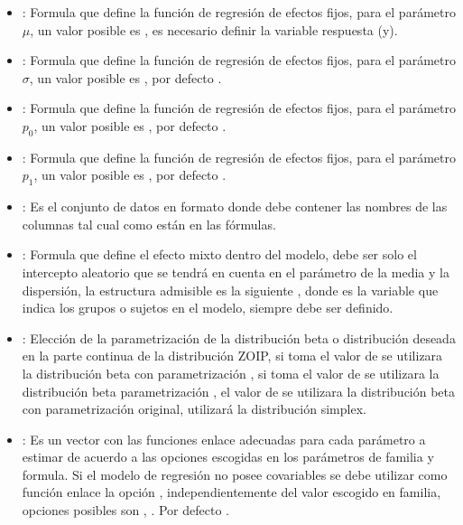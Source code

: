 \begin{itemize}[noitemsep, nolistsep]

\item {}: Formula que define la funci\'{o}n de regresi\'{o}n de efectos fijos, para el par\'{a}metro $\mu$, un valor posible es , es necesario definir la variable respuesta (y).
\item {}: Formula que define la funci\'{o}n de regresi\'{o}n de efectos fijos, para el par\'{a}metro $\sigma$, un valor posible es , por defecto .
\item {}: Formula que define la funci\'{o}n de regresi\'{o}n de efectos fijos, para el par\'{a}metro $p_0$, un valor posible es , por defecto .
\item {}: Formula que define la funci\'{o}n de regresi\'{o}n de efectos fijos, para el par\'{a}metro $p_1$, un valor posible es , por defecto .
\item {}: Es el conjunto de datos en formato  donde debe contener las nombres de las columnas tal cual como est\'{a}n en las f\'{o}rmulas.
\item {}: Formula que define el efecto mixto dentro del modelo, debe ser solo el intercepto aleatorio que se tendr\'{a} en cuenta en el par\'{a}metro de la media y la dispersi\'{o}n, la estructura admisible es la siguiente , donde  es la variable que indica los grupos o sujetos en el modelo, siempre debe ser definido.
\item {}: Elecci\'{o}n de la parametrizaci\'{o}n de la distribuci\'{o}n beta o distribuci\'{o}n deseada en la parte continua de la distribuci\'{o}n ZOIP, si toma el valor de  se utilizara la distribuci\'{o}n beta con parametrizaci\'{o}n \cite{Stasinopoulos2}, si toma el valor de  se utilizara la distribuci\'{o}n beta parametrizaci\'{o}n \cite{Ferrari2}, el valor de  se utilizara la distribuci\'{o}n beta con parametrizaci\'{o}n original,  utilizar\'{a} la distribuci\'{o}n simplex.
\item {}: Es un vector con las funciones enlace adecuadas para cada par\'{a}metro a estimar de acuerdo a las opciones escogidas en los par\'{a}metros de familia y formula. Si el modelo de regresi\'{o}n no posee covariables se debe utilizar como funci\'{o}n enlace la opci\'{o}n , independientemente del valor escogido en familia, opciones posibles son , . Por defecto .

\end{itemize}
